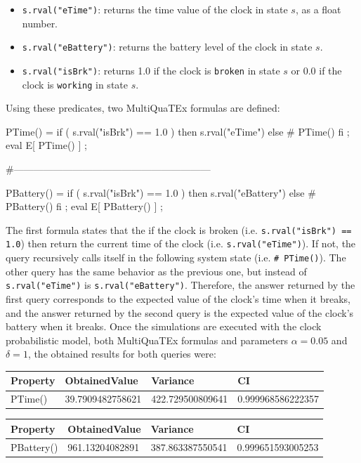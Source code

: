 \begin{itemize}
    \item \texttt{s.rval("eTime")}: returns the time value of the clock in state $s$, as a float number.
    \item \texttt{s.rval("eBattery")}: returns the battery level of the clock in state $s$.
    \item \texttt{s.rval("isBrk")}: returns 1.0 if the clock is \texttt{broken} in state $s$ or 0.0 if the clock is \texttt{working} in state $s$.
\end{itemize}
Using these predicates, two MultiQuaTEx formulas are defined:
\\
\begin{maude2}
PTime() = if ( s.rval("isBrk") == 1.0 ) 
          then s.rval("eTime") else # PTime() fi ;
eval E[ PTime() ] ;

#------------------------------------------------------------

PBattery() = if ( s.rval("isBrk") == 1.0 ) 
             then s.rval("eBattery") else # PBattery() fi ;
eval E[ PBattery() ] ;
\end{maude2}
The first formula states that the if the clock is broken (i.e. \texttt{s.rval("isBrk") == 1.0}) then return the current time of the clock (i.e. \texttt{s.rval("eTime")}). If not, the query recursively calls itself in the following system state (i.e. \texttt{\# PTime()}). The other query has the same behavior as the previous one, but instead of \texttt{s.rval("eTime")} is \texttt{s.rval("eBattery")}. Therefore, the answer returned by the first query corresponds to the expected value of the clock's time when it breaks, and the answer returned by the second query is the expected value of the clock's battery when it breaks. Once the simulations are executed with the clock probabilistic model, both MultiQuaTEx formulas and parameters $\alpha = 0.05$ and $\delta = 1$, the obtained results for both queries were:
\begin{table}[H]
\centering
\begin{tabular}{|l|l|l|l|}
\hline
Property & ObtainedValue    & Variance         & CI                 \\ \hline
PTime()  & 39.7909482758621 & 422.729500809641 & 0.999968586222357         \\ \hline
\end{tabular}
\end{table}
\begin{table}[H]
\centering
\begin{tabular}{|l|l|l|l|}
\hline
Property   & ObtainedValue   & Variance         & CI                 \\ \hline
PBattery() & 961.13204082891 & 387.863387550541 & 0.999651593005253 \\ \hline
\end{tabular}
\end{table}

